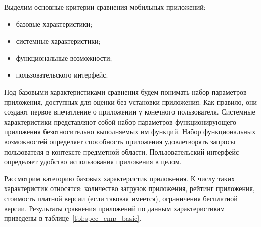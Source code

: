 Выделим основные критерии сравнения мобильных приложений:
\begin{itemize}
\item базовые характеристики;
\item системные характеристики;
\item функциональные возможности;
\item пользовательского интерфейс.
\end{itemize}

Под базовыми характеристиками сравнения будем понимать
набор параметров приложения, доступных для оценки без установки приложения.
Как правило, они создают первое впечатление о приложении у конечного пользователя.
Системные характеристики представляют собой набор параметров функционирующего
приложения безотносительно выполняемых им функций.
Набор функциональных возможностей определяет способность приложения
удовлетворять запросы пользователя в контексте предметной области.
Пользовательский интерфейс определяет удобство использования приложения в целом.

Рассмотрим категорию базовых характеристик приложения.
К числу таких характеристик относятся:
количество загрузок приложения, рейтинг приложения,
стоимость платной версии (если таковая имеется), ограничения бесплатной версии.
Результаты сравнения приложений по данным характеристикам приведены
в таблице~\ref{tbl:spec_cmp_basic}.

